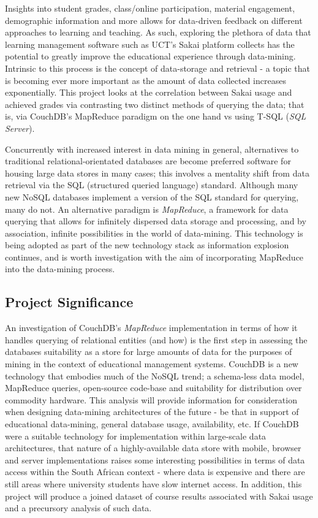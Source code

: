 Insights into student grades, class/online participation, material engagement, demographic information and more allows for data-driven feedback on different approaches to learning and teaching. As such, exploring the plethora of data that learning management software such as UCT's Sakai platform collects has the potential to greatly improve the educational experience through data-mining. Intrinsic to this process is the concept of data-storage and retrieval - a topic that is becoming ever more important as the amount of data collected increases exponentially. This project looks at the correlation between Sakai usage and achieved grades via contrasting two distinct methods of querying the data; that is, via CouchDB's MapReduce paradigm on the one hand vs using T-SQL (\textit{SQL Server}).

Concurrently with increased interest in data mining in general, alternatives to traditional relational-orientated databases are become preferred software for housing large data stores in many cases; this involves a mentality shift from data retrieval via the SQL (structured queried language) standard. Although many new NoSQL databases implement a version of the SQL standard for querying, many do not. An alternative paradigm is \textit{MapReduce}, a framework for data querying that allows for infinitely dispersed data storage and processing, and by association, infinite possibilities in the world of data-mining. This technology is being adopted as part of the new technology stack as information explosion continues, and is worth investigation with the aim of incorporating MapReduce into the data-mining process.

\subsection{Project Significance}
An investigation of CouchDB's \textit{MapReduce} implementation in terms of how it handles querying of relational entities (and how) is the first step in assessing the databases suitability as a store for large amounts of data for the purposes of mining in the context of educational management systems. CouchDB is a new technology that embodies much of the NoSQL trend; a schema-less data model, MapReduce queries, open-source code-base and suitability for distribution over commodity hardware. This analysis will provide information for consideration when designing data-mining architectures of the future - be that in support of educational data-mining, general database usage, availability, etc. If CouchDB were a suitable technology for implementation within large-scale data architectures, that nature of a highly-available data store with mobile, browser and server implementations raises some interesting possibilities in terms of data access within the South African context - where data is expensive and there are still areas where university students have slow internet access. In addition, this project will produce a joined dataset of course results associated with Sakai usage and a precursory analysis of such data.

